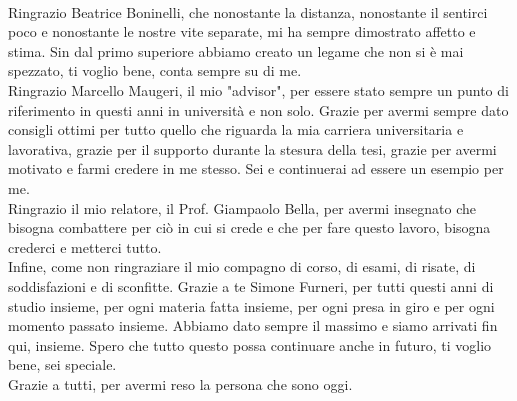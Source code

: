 \\Ringrazio Beatrice Boninelli, che nonostante la distanza, nonostante il sentirci poco e nonostante le nostre vite separate, mi ha sempre dimostrato affetto e stima. Sin dal primo superiore abbiamo creato un legame che non si è mai spezzato, ti voglio bene, conta sempre su di me.
\\Ringrazio Marcello Maugeri, il mio "advisor", per essere stato sempre un punto di riferimento in questi anni in università e non solo. Grazie per avermi sempre dato consigli ottimi per tutto quello che riguarda la mia carriera universitaria e lavorativa, grazie per il supporto durante la stesura della tesi, grazie per avermi motivato e farmi credere in me stesso. Sei e continuerai ad essere un esempio per me.
\\Ringrazio il mio relatore, il Prof. Giampaolo Bella, per avermi insegnato che bisogna combattere per ciò in cui si crede e che per fare questo lavoro, bisogna crederci e metterci tutto.
\\Infine, come non ringraziare il mio compagno di corso, di esami, di risate, di soddisfazioni e di sconfitte. Grazie a te Simone Furneri, per tutti questi anni di studio insieme, per ogni materia fatta insieme, per ogni presa in giro e per ogni momento passato insieme. Abbiamo dato sempre il massimo e siamo arrivati fin qui, insieme. Spero che tutto questo possa continuare anche in futuro, ti voglio bene, sei speciale.
\\Grazie a tutti, per avermi reso la persona che sono oggi.